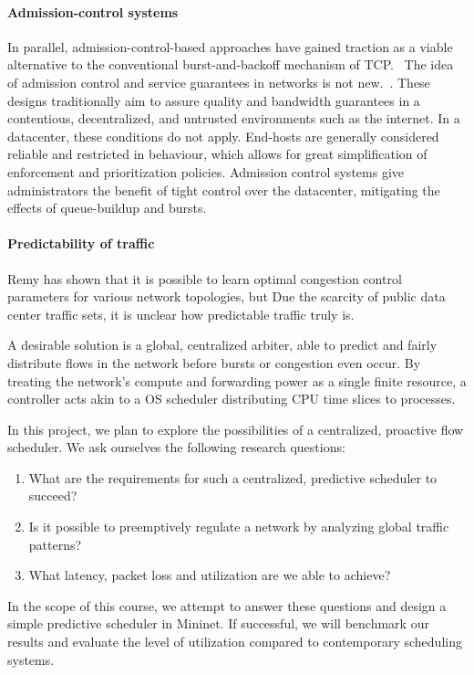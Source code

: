 \paragraph{Admission-control systems}
In parallel, admission-control-based approaches have gained traction as a 
viable alternative to the conventional burst-and-backoff mechanism of 
TCP.~\cite{expresspass, fastpass, perc}
The idea of admission control and service guarantees in networks is not 
new.~\cite{access_limit, access_limit2}. These designs traditionally 
aim to assure quality and bandwidth guarantees in a contentious, decentralized, 
and untrusted environments such as the internet. In a datacenter, these 
conditions do not apply. End-hosts are generally considered reliable and 
restricted in behaviour, which allows for great simplification of enforcement 
and prioritization policies. Admission control systems give administrators the 
benefit of tight control over the datacenter, mitigating the effects of 
queue-buildup and bursts.

\paragraph{Predictability of traffic}
Remy\cite{remy} has shown that it is possible to learn optimal congestion 
control parameters for various network topologies, but 
Due the scarcity of public data center traffic sets, it is unclear how 
predictable traffic truly is. 


A desirable solution is a global, centralized arbiter, able to predict and 
fairly distribute flows in the network before bursts or congestion even occur. 
By treating the network's compute and forwarding power as a single finite 
resource, a controller acts akin to a OS scheduler distributing CPU time slices 
to processes.

In this project, we plan to explore the possibilities of a centralized, 
proactive flow scheduler. We ask ourselves the following research questions:
\begin{enumerate}
    \item What are the requirements for such a centralized, predictive 
    scheduler to succeed?
    \item Is it possible to preemptively regulate a network by analyzing global 
    traffic patterns?
    \item What latency, packet loss and utilization are we able to achieve?
\end{enumerate}

In the scope of this course, we attempt to answer these questions and design a 
simple predictive scheduler in Mininet. If successful, we will benchmark our 
results and evaluate the level of utilization compared to contemporary 
scheduling systems.